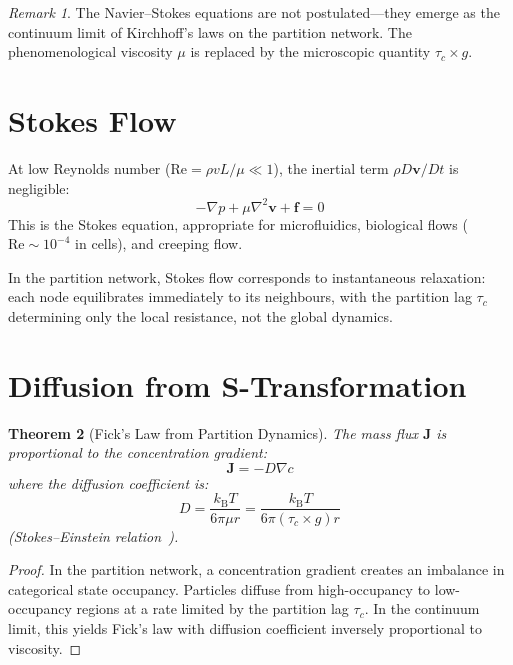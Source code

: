 \documentclass[twocolumn,10pt,a4paper]{article}
\theoremstyle{plain}
\newtheorem{theorem}{Theorem}[section]
\theoremstyle{definition}
\theoremstyle{remark}
\newtheorem{remark}[theorem]{Remark}
\newcommand{\kB}{k_{\mathrm{B}}}
\newcommand{\tauc}{\tau_c}
\begin{document}
\begin{remark}
The Navier--Stokes equations are not postulated---they emerge as the continuum limit of Kirchhoff's laws on the partition network. The phenomenological viscosity $\mu$ is replaced by the microscopic quantity $\tauc \times g$.
\end{remark}

\section{Stokes Flow}
\label{sec:stokes}

At low Reynolds number ($\mathrm{Re} = \rho v L/\mu \ll 1$), the inertial term $\rho D\mathbf{v}/Dt$ is negligible:
\begin{equation}
    -\nabla p + \mu \nabla^2 \mathbf{v} + \mathbf{f} = 0
\end{equation}
This is the Stokes equation, appropriate for microfluidics, biological flows ($\mathrm{Re} \sim 10^{-4}$ in cells), and creeping flow.

In the partition network, Stokes flow corresponds to instantaneous relaxation: each node equilibrates immediately to its neighbours, with the partition lag $\tauc$ determining only the local resistance, not the global dynamics.

\section{Diffusion from S-Transformation}
\label{sec:diffusion}

\begin{theorem}[Fick's Law from Partition Dynamics]
\label{thm:fick}
The mass flux $\mathbf{J}$ is proportional to the concentration gradient:
\begin{equation}
    \mathbf{J} = -D\nabla c
\end{equation}
where the diffusion coefficient is:
\begin{equation}
    D = \frac{\kB T}{6\pi \mu r} = \frac{\kB T}{6\pi (\tauc \times g) r}
\end{equation}
(Stokes--Einstein relation~\cite{einstein1905}).
\end{theorem}

\begin{proof}
In the partition network, a concentration gradient creates an imbalance in categorical state occupancy. Particles diffuse from high-occupancy to low-occupancy regions at a rate limited by the partition lag $\tauc$. In the continuum limit, this yields Fick's law with diffusion coefficient inversely proportional to viscosity.
\end{proof}
\end{document}
